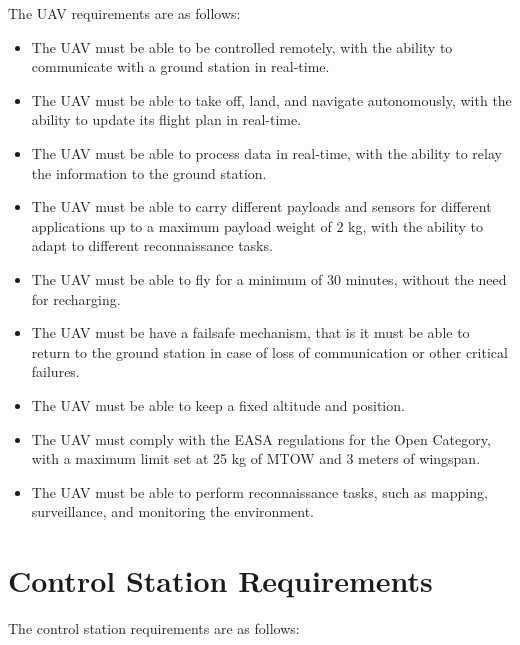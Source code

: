 The UAV requirements are as follows:

\begin{itemize}
  \item The UAV must be able to be controlled remotely, with the ability to communicate with a ground station in real-time.

  \item The UAV must be able to take off, land, and navigate autonomously, with the ability to update its flight plan in real-time.

  \item The UAV must be able to process data in real-time, with the ability to relay the information to the ground station.

  \item The UAV must be able to carry different payloads and sensors for different applications up to a maximum payload weight of 2 kg, with the ability to adapt to different reconnaissance tasks.

  \item The UAV must be able to fly for a minimum of 30 minutes, without the need for recharging.

  \item The UAV must be have a failsafe mechanism, that is it must be able to return to the ground station in case of loss of communication or other critical failures.

  \item The UAV must be able to keep a fixed altitude and position.

  \item The UAV must comply with the EASA regulations for the Open Category, with a maximum limit set at 25 kg of MTOW and 3 meters of wingspan.

  \item The UAV must be able to perform reconnaissance tasks, such as mapping, surveillance, and monitoring the environment.
\end{itemize}

\section{Control Station Requirements}

The control station requirements are as follows:


